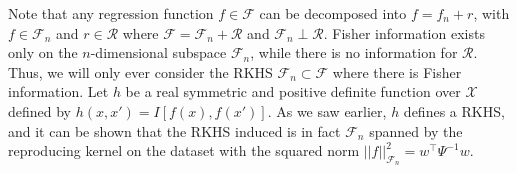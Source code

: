 Note that any regression function $f\in \mathcal F$ can be decomposed into $f = f_n + r$, with $f \in \mathcal F_n$ and $r \in \mathcal R$ where $\mathcal F = \mathcal F_n + \mathcal R$ and $\mathcal F_n \perp \mathcal R$. Fisher information exists only on the $n$-dimensional subspace $\mathcal F_n$, while there is no information for $\mathcal R$. Thus, we will only ever consider the RKHS $\mathcal F_n \subset \mathcal F$ where there is Fisher information. Let $h$ be a real symmetric and positive definite function over $\mathcal X$ defined by $h(x,x') = I[f(x),f(x')]$. As we saw earlier, $h$ defines a RKHS, and it can be shown that the RKHS induced is in fact $\mathcal F_n$ spanned by the reproducing kernel on the dataset with the squared norm $||f||_{\mathcal F_n}^2 = w^\top\Psi^{-1}w$.

